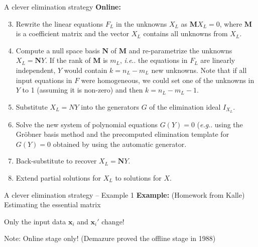 \documentclass[aspectratio=169]{beamer}
\makeatletter
\newcommand{\mat}[1]{\bm{#1}}
\DeclareMathOperator{\tr}{tr}
\newcommand{\T}{T}
\DeclareRobustCommand\eg{\emph{e.g}\@ifnextchar.{}{.\@}}
\DeclareRobustCommand\ie{\emph{i.e}\@ifnextchar.{}{.\@}}
\makeatother
\begin{document}
\begin{frame}{A clever elimination strategy}
\textbf{Online:}
{\footnotesize
\begin{enumerate}
    \setcounter{enumi}{2}
    \item Rewrite the linear equations $F_L$ in the unknowns $X_L$ as $\mat{M}X_L= 0$, where $\mat{M}$
    is a coefficient matrix and the vector $X_L$ contains all unknowns from $X_L$.
    \item Compute a null space basis $\mat{N}$ of $\mat{M}$ and re-parametrize the unknowns $X_L=\mat{N}Y$. If the
    rank of $\mat{M}$ is $m_L$, \ie{} the equations in $F_L$ are linearly independent, $Y$ would contain
    $k=n_L - m_L$ new unknowns. Note that if all input equations in $F$ were homogeneous, we could
    set one of the unknowns in $Y$ to 1 (assuming it is non-zero) and then $k=n_L-m_L-1$.
    \item Substitute $X_L=NY$ into the generators $G$ of the elimination ideal $I_{X_L}$.
    \item Solve the new system of polynomial equations $G(Y) = 0$ (\eg{} using the Gröbner basis
    method and the precomputed elimination template for~\mbox{$G(Y) = 0$} obtained by using the automatic
    generator.
    \item Back-substitute to recover $X_L=\mat{N}Y$.
    \item Extend partial solutions for $X_L$ to solutions for $X$.
\end{enumerate}
}
\end{frame}

\begin{frame}{A clever elimination strategy -- Example 1}
\textbf{Example:} (Homework from Kalle) Estimating the essential matrix
\begin{center}
\end{center}

Only the input data $\mat{x}_i$ and $\mat{x}_i'$ change!

\alert{Note:} Online stage only! (Demazure proved the offline stage in 1988)
\end{frame}
\end{document}
